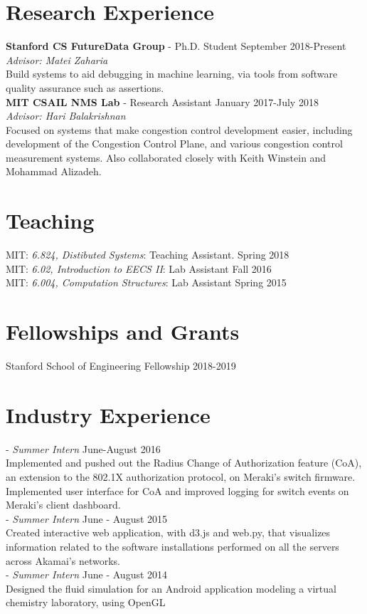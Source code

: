 \documentclass[11pt]{report}
\begin{document}
\section{Research Experience}
\textbf{Stanford CS FutureData Group} - Ph.D. Student  \hfill {September 2018-Present}\\
\emph{Advisor: Matei Zaharia}\\
Build systems to aid debugging in machine learning, via tools from software
quality assurance such as assertions.\\

\noindent \textbf{MIT CSAIL NMS Lab} - Research Assistant \hfill {January 2017-July 2018}\\
\emph{Advisor: Hari Balakrishnan}\\
Focused on systems that make congestion control development easier, including development of the Congestion Control Plane, and various congestion control measurement systems. Also collaborated closely with Keith Winstein and Mohammad Alizadeh.

\section{Teaching}
MIT: \emph{6.824, Distibuted Systems}: Teaching Assistant. \hfill Spring 2018\\
\noindent MIT: \emph{6.02, Introduction to EECS II}: Lab Assistant \hfill Fall 2016\\
\noindent MIT: \emph{6.004, Computation Structures}: Lab Assistant \hfill Spring 2015

\section{Fellowships and Grants}
Stanford School of Engineering Fellowship \hfill 2018-2019\\
\section{Industry Experience}
 - {\em{Summer Intern}}  \hfill  June-August 2016\\
Implemented and pushed out the Radius Change of Authorization feature (CoA), an
extension to the 802.1X authorization protocol, on Meraki's switch firmware. Implemented user interface for CoA and improved logging for switch events on Meraki's client dashboard.\\

 - {\em{Summer Intern}} \hfill June - August 2015\\
Created interactive web application, with d3.js and web.py, that visualizes information
related to the software installations performed on all the servers across Akamai’s networks.\\

 - {\em{Summer Intern}} \hfill June - August 2014\\
Designed the fluid simulation for an Android application modeling a virtual chemistry laboratory, using OpenGL
\end{document}
